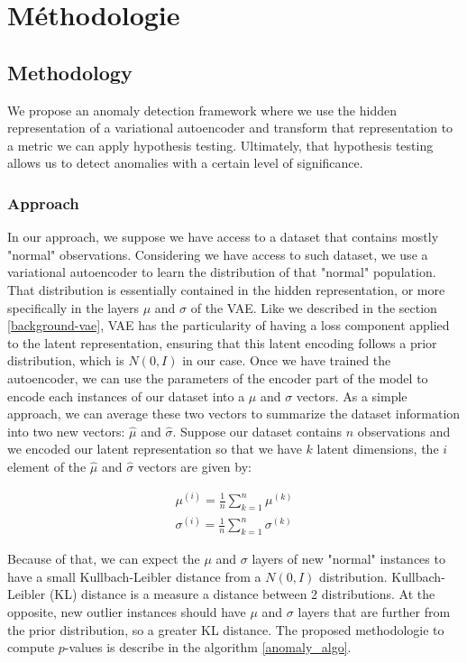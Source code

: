 \chapter{Méthodologie}     %
\label{chap:methodologie}                   %


\section{Methodology}

We propose an anomaly detection framework where we use the hidden representation of a variational autoencoder and transform that representation to a metric we can apply hypothesis testing. Ultimately, that hypothesis testing allows us to detect anomalies with a certain level of significance.

\subsection{Approach}

In our approach, we suppose we have access to a dataset that contains mostly "normal" observations. Considering we have access to such dataset, we use a variational autoencoder to learn the distribution of that "normal" population. That distribution is essentially contained in the hidden representation, or more specifically in the layers $\mu$ and $\sigma$ of the VAE. Like we described in the section \ref{background-vae}, VAE has the particularity of having a loss component applied to the latent representation, ensuring that this latent encoding follows a prior distribution, which is $N(0, I)$ in our case. Once we have trained the autoencoder, we can use the parameters of the encoder part of the model to encode each instances of our dataset into a $\mu$ and $\sigma$ vectors. As a simple approach, we can average these two vectors to summarize the dataset information into two new vectors: $\hat{\mu}$ and $\hat{\sigma}$. Suppose our dataset contains $n$ observations and we encoded our latent representation so that we have $k$ latent dimensions, the $i$ element of the $\hat{\mu}$ and $\hat{\sigma}$ vectors are given by:

\begin{gather*}
\mu^{(i)} = \frac{1}{n} \sum_{k=1}^{n} \mu^{(k)} \\
\sigma^{(i)} = \frac{1}{n} \sum_{k=1}^{n} \sigma^{(k)}
\end{gather*}


Because of that, we can expect the $\mu$ and $\sigma$ layers of new "normal" instances to have a small Kullbach-Leibler distance from a $N(0, I)$ distribution. Kullbach-Leibler (KL) distance is a measure a distance between 2 distributions. At the opposite, new outlier instances should have $\mu$ and $\sigma$ layers that are further from the prior distribution, so a greater KL distance. The proposed methodologie to compute $p$-values is describe in the algorithm \ref{anomaly_algo}.
\newline

